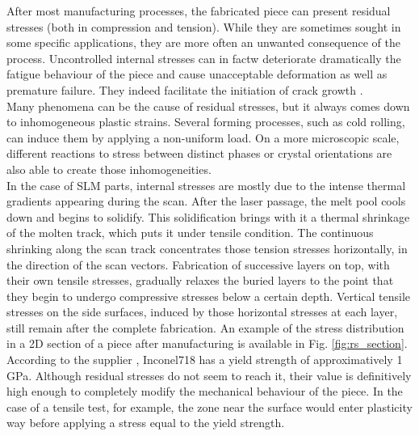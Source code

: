 After most manufacturing processes, the fabricated piece can present residual stresses (both in compression and tension). While they are sometimes sought in some specific applications, they are more often an unwanted consequence of the process. Uncontrolled internal stresses can in factw deteriorate dramatically the fatigue behaviour of the piece and cause unacceptable deformation as well as premature failure. They indeed facilitate the initiation of crack growth \cite{Vrancken2016}.\\

Many phenomena can be the cause of residual stresses, but it always comes down to inhomogeneous plastic strains. Several forming processes, such as cold rolling, can induce them by applying a non-uniform load. On a more microscopic scale, different reactions to stress between distinct phases or crystal orientations are also able to create those inhomogeneities.\\

In the case of SLM parts, internal stresses are mostly due to the intense thermal gradients appearing during the scan. After the laser passage, the melt pool cools down and begins to solidify. This solidification brings with it a thermal shrinkage of the molten track, which puts it under tensile condition. The continuous shrinking along the scan track concentrates those tension stresses horizontally, in the direction of the scan vectors. Fabrication of successive layers on top, with their own tensile stresses, gradually relaxes the buried layers to the point that they begin to undergo compressive stresses below a certain depth. Vertical tensile stresses on the side surfaces, induced by those horizontal stresses at each layer, still remain after the complete fabrication. An example of the stress distribution in a 2D section of a piece after manufacturing is available in Fig. \ref{fig:rs_section}. According to the supplier \cite{Inconel}, Inconel718 has a yield strength of approximatively 1 GPa. Although residual stresses do not seem to reach it, their value is definitively high enough to completely modify the mechanical behaviour of the piece. In the case of a tensile test, for example, the zone near the surface would enter plasticity way before applying a stress equal to the yield strength. \\

